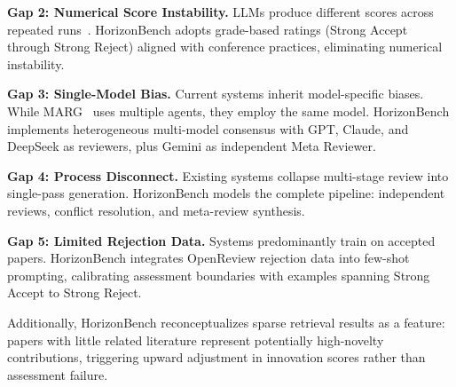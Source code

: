\textbf{Gap 2: Numerical Score Instability.} LLMs produce different scores across repeated runs~\cite{zhou2024llm}. HorizonBench adopts grade-based ratings (Strong Accept through Strong Reject) aligned with conference practices, eliminating numerical instability.

\textbf{Gap 3: Single-Model Bias.} Current systems inherit model-specific biases. While MARG~\cite{darcy2024marg} uses multiple agents, they employ the same model. HorizonBench implements heterogeneous multi-model consensus with GPT, Claude, and DeepSeek as reviewers, plus Gemini as independent Meta Reviewer.

\textbf{Gap 4: Process Disconnect.} Existing systems collapse multi-stage review into single-pass generation. HorizonBench models the complete pipeline: independent reviews, conflict resolution, and meta-review synthesis.

\textbf{Gap 5: Limited Rejection Data.} Systems predominantly train on accepted papers. HorizonBench integrates OpenReview rejection data into few-shot prompting, calibrating assessment boundaries with examples spanning Strong Accept to Strong Reject.

Additionally, HorizonBench reconceptualizes sparse retrieval results as a feature: papers with little related literature represent potentially high-novelty contributions, triggering upward adjustment in innovation scores rather than assessment failure.
